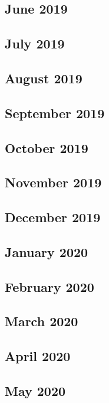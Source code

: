 \documentclass{article}
\begin{document}
	\subsection{June 2019}
	
	\subsection{July 2019}
	
	\subsection{August 2019}
	
	\subsection{September 2019}
	
	\subsection{October 2019}
	
	\subsection{November 2019}
	
	\subsection{December 2019}
	
	\subsection{January 2020}
	
	\subsection{February 2020}
	
	\subsection{March 2020}
	
	\subsection{April 2020}	
	
	\subsection{May 2020}
	
\end{document}
